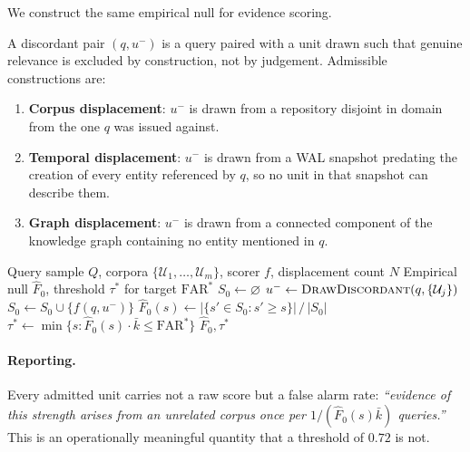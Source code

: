 We construct the same empirical null for evidence scoring.

\begin{definition}
\label{def:discordant-pair}
A discordant pair $(q, u^-)$ is a query paired with a unit drawn such that genuine relevance is excluded by construction, not by judgement. Admissible constructions are:
\begin{enumerate}
  \item \textbf{Corpus displacement}: $u^-$ is drawn from a repository disjoint in domain from the one $q$ was issued against.
  \item \textbf{Temporal displacement}: $u^-$ is drawn from a WAL snapshot predating the creation of every entity referenced by $q$, so no unit in that snapshot can describe them.
  \item \textbf{Graph displacement}: $u^-$ is drawn from a connected component of the knowledge graph containing no entity mentioned in $q$.
\end{enumerate}
\end{definition}

\begin{algorithm}[H]
\caption{False Alarm Rate Estimation without Relevance Labels}
\label{alg:far}
\begin{algorithmic}[1]
\Require Query sample $Q$, corpora $\{\mathcal{U}_1,\dots,\mathcal{U}_m\}$, scorer $f$, displacement count $N$
\Ensure Empirical null $\hat{F}_0$, threshold $\tau^*$ for target $\text{FAR}^*$
\State $S_0 \gets \varnothing$
    \State $u^- \gets \textsc{DrawDiscordant}(q, \{\mathcal{U}_j\})$ 
    \State $S_0 \gets S_0 \cup \{f(q, u^-)\}$
  \EndFor
\EndFor
\State $\hat{F}_0(s) \gets |\{s' \in S_0 : s' \geq s\}| \, / \, |S_0|$ 
\State $\tau^* \gets \min \{ s : \hat{F}_0(s) \cdot \bar{k} \leq \text{FAR}^* \}$ 
\State \Return $\hat{F}_0, \tau^*$
\end{algorithmic}
\end{algorithm}

\paragraph{Reporting.} Every admitted unit carries not a raw score but a false alarm rate: \emph{``evidence of this strength arises from an unrelated corpus once per $1/(\hat{F}_0(s)\bar{k})$ queries.''} This is an operationally meaningful quantity that a threshold of $0.72$ is not.


